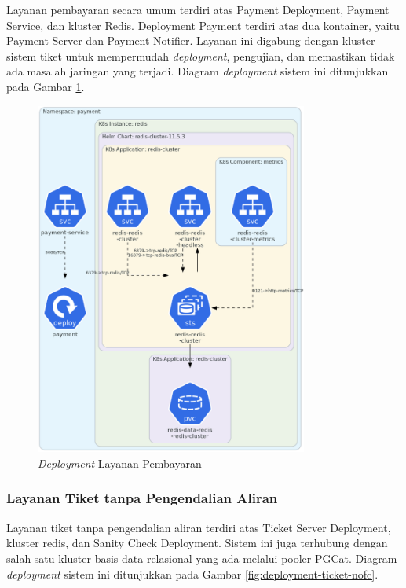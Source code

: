 Layanan pembayaran secara umum terdiri atas Payment Deployment, Payment Service, dan kluster Redis. Deployment Payment terdiri atas dua kontainer, yaitu Payment Server dan Payment Notifier. Layanan ini digabung dengan kluster sistem tiket untuk mempermudah \textit{deployment}, pengujian, dan memastikan tidak ada masalah jaringan yang terjadi. Diagram \textit{deployment} sistem ini ditunjukkan pada Gambar \ref{fig:deployment-payment}.

\begin{figure}[htbp]
    \centering
    \includegraphics[width=0.8\textwidth]{resources/chapter-4/payment.png}
    \caption{\textit{Deployment} Layanan Pembayaran}
    \label{fig:deployment-payment}
\end{figure}


\pagebreak

\subsubsection{Layanan Tiket tanpa Pengendalian Aliran}

Layanan tiket tanpa pengendalian aliran terdiri atas Ticket Server Deployment, kluster redis, dan Sanity Check Deployment. Sistem ini juga terhubung dengan salah satu kluster basis data relasional yang ada melalui pooler PGCat. Diagram \textit{deployment} sistem ini ditunjukkan pada Gambar \ref{fig:deployment-ticket-nofc}.

